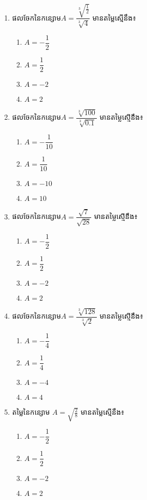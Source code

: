 \begin{enumerate}
\item ផលចែកនៃកន្សោម$A=\dfrac{\sqrt[3]{\frac{1}{2}}}{\sqrt[3]{4}}$  មានតម្លៃស្មើនឹង៖
\begin{multicols}{4}
\begin{enumerate}[label=\alph*.]
	\item $A=-\dfrac{1}{2}$
	\item $A=\dfrac{1}{2}$
	\item $A=-2$
	\item $A=2$
\end{enumerate}
\end{multicols}
\item ផលចែកនៃកន្សោម$A=\dfrac{\sqrt[3]{100}}{\sqrt[3]{0.1}}$  មានតម្លៃស្មើនឹង៖
\begin{multicols}{4}
\begin{enumerate}[label=\alph*.]
	\item $A=-\dfrac{1}{10}$
	\item $A=\dfrac{1}{10}$
	\item $A=-10$
	\item $A=10$
\end{enumerate}
\end{multicols}

\item ផលចែកនៃកន្សោម$A=\dfrac{\sqrt{7}}{\sqrt{28}}$  មានតម្លៃស្មើនឹង៖
\begin{multicols}{4}
\begin{enumerate}[label=\alph*.]
	\item $A=-\dfrac{1}{2}$
	\item $A=\dfrac{1}{2}$
	\item $A=-2$
	\item $A=2$
\end{enumerate}
\end{multicols}
\item ផលចែកនៃកន្សោម$A=\dfrac{\sqrt[3]{128}}{\sqrt[3]{2}}$  មានតម្លៃស្មើនឹង៖
\begin{multicols}{4}
\begin{enumerate}[label=\alph*.]
	\item $A=-\dfrac{1}{4}$
	\item $A=\dfrac{1}{4}$
	\item $A=-4$
	\item $A=4$
\end{enumerate}
\end{multicols}

\item តម្លៃនៃកន្សោម $A=\sqrt{\frac{2}{8}}$ មានតម្លៃស្មើនឹង៖
\begin{multicols}{4}
\begin{enumerate}[label=\alph*.]
	\item $A=-\dfrac{1}{2}$
	\item $A=\dfrac{1}{2}$
	\item $A=-2$
	\item $A=2$
\end{enumerate}
\end{multicols}


\end{enumerate}
